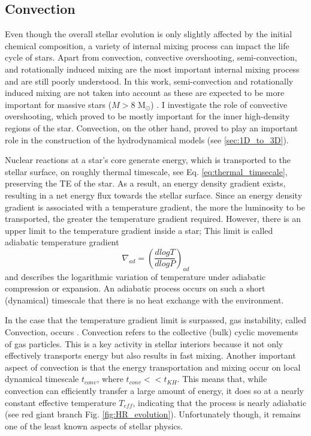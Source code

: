 \subsection{Convection}\label{sec:convection}

Even though the overall stellar evolution is only slightly affected by the initial chemical composition, a variety of internal mixing process can impact the life cycle of stars. Apart from convection, convective overshooting, semi-convection, and rotationally induced mixing are the most important internal mixing process \citep{schootemeijer2019constraining} and are still poorly understood. In this work, semi-convection and rotationally induced mixing are not taken into account as these are expected to be more important for massive stars ($M>8$ M$_{\odot}$) \citep{langer2012presupernova}. I investigate the role of convective overshooting, which proved to be mostly important for the inner high-density regions of the star. Convection, on the other hand, proved to play an important role in the construction of the hydrodynamical models (see \cref{sec:1D_to_3D}).

Nuclear reactions at a star's core generate energy,
which is transported to the stellar surface, on roughly thermal timescale, see Eq. \eqref{eq:thermal_timsecale}, preserving the TE of the star. As a result, an energy density gradient exists, resulting in a net energy flux towards the stellar surface. Since an energy density gradient is associated with a temperature gradient, the more the luminosity to be transported, the greater the temperature gradient required. However, there is an upper limit to the temperature gradient inside a star; This limit is called adiabatic temperature gradient
\begin{equation}\label{eq:ad_tempe_grad}
    \nabla_{ad} = \left ( \frac{d logT}{d logP} \right)_{ad} 
\end{equation}
and describes the logarithmic variation of temperature under adiabatic compression or expansion. An adiabatic process occurs on such a short (dynamical) timescale that there is no heat exchange with the environment.

In the case that the temperature gradient limit is surpassed, gas instability, called Convection, occurs \citep{pols2011stellar}. Convection refers to the collective (bulk) cyclic movements of gas particles. This is a key activity in stellar interiors because it not only effectively transports energy but also results in fast mixing. Another important aspect of convection is that the energy transportation and mixing occur on local dynamical timescale $t_{conv}$, where $t_{conv} << t_{KH}$. This means that, while convection can efficiently transfer a large amount of energy, it does so at a nearly constant effective temperature $T_{eff}$, indicating that the process is nearly adiabatic (see red giant branch Fig. \ref{fig:HR_evolution}). Unfortunately though, it remains one of the least known aspects of stellar physics.

